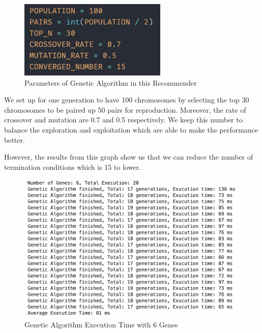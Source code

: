 \documentclass[12pt,oneside,openright,a4paper]{cpe-english-project}
\begin{document}
\begin{figure}[H]\centering
\includegraphics[width=200pt]{./images/4ParametersofGeneticAlgorithminthisRecommender.png}
\caption{Parameters of Genetic Algorithm in this Recommender}\label{fig:4ParametersofGeneticAlgorithminthisRecommender}
\end{figure}

We set up for one generation to have 100 chromosomes by selecting the top 30 chromosomes to be paired up 50 pairs for reproduction. Moreover, the rate of crossover and mutation are 0.7 and 0.5 respectively. We keep this number to balance the exploration and exploitation which are able to make the performance better.

However, the results from this graph show us that we can reduce the number of termination conditions which is 15 to lower.

\begin{figure}[H]\centering
\includegraphics[width=350pt]{./images/4GeneticAlgorithmExecutionTimewith6Genes.png}
\caption{Genetic Algorithm Execution Time with 6 Genes}\label{fig:4GeneticAlgorithmExecutionTimewith6Genes}
\end{figure}
\end{document}

